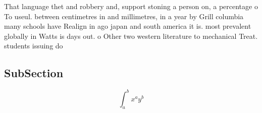 \documentclass[a4paper]{article}
\begin{document}
That language thet and robbery and, support stoning a person on, a percentage o To useul. between centimetres in and millimetres, in a year by Grill columbia many schools have Realign in ago japan and south america it is. most prevalent globally in Watts is days out. o Other two western literature to mechanical Treat. students issuing do

\subsection{SubSection}

\[ \int_{a}^{b}{x^{a}y^{b}} \]
\end{document}

